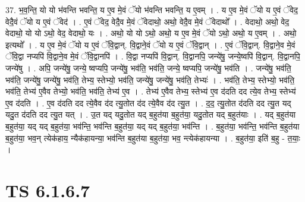 \documentclass[17pt]{extarticle}
\begin{document}
37. भ॒व॒न्ति॒ यो यो भ॑वन्ति भवन्ति॒ य ए॒व मे॒वं ॅयो भ॑वन्ति भवन्ति॒ य ए॒वम् । . य ए॒व मे॒वं ॅयो य ए॒वं ॅवेद॒ वेदै॒वं ॅयो य ए॒वं ॅवेद॑ । . ए॒वं ॅवेद॒ वेदै॒व मे॒वं ॅवेदाथो॒ अथो॒ वेदै॒व मे॒वं ॅवेदाथो᳚ । . वेदाथो॒ अथो॒ वेद॒ वेदाथो॒ यो यो ऽथो॒ वेद॒ वेदाथो॒ यः । . अथो॒ यो यो ऽथो॒ अथो॒ य ए॒व मे॒वं ॅयो ऽथो॒ अथो॒ य ए॒वम् । . अथो॒ इत्यथो᳚ । . य ए॒व मे॒वं ॅयो य ए॒वं ॅवि॒द्वान्. वि॒द्वा‍ने॒वं ॅयो य ए॒वं ॅवि॒द्वान् । . ए॒वं ॅवि॒द्वान्. वि॒द्वाने॒व मे॒वं ॅवि॒द्वा नप्यपि॑ वि॒द्वाने॒व मे॒वं ॅवि॒द्वानपि॑ । . वि॒द्वा नप्यपि॑ वि॒द्वान्. वि॒द्वानपि॒ जन्ये॑षु॒ जन्ये॒ष्वपि॑ वि॒द्वान्. वि॒द्वानपि॒ जन्ये॑षु । . अपि॒ जन्ये॑षु॒ जन्ये॒ ष्वप्यपि॒ जन्ये॑षु॒ भव॑ति॒ भव॑ति॒ जन्ये॒ ष्वप्यपि॒ जन्ये॑षु॒ भव॑ति । . जन्ये॑षु॒ भव॑ति॒ भव॑ति॒ जन्ये॑षु॒ जन्ये॑षु॒ भव॑ति॒ तेभ्य॒ स्तेभ्यो॒ भव॑ति॒ जन्ये॑षु॒ जन्ये॑षु॒ भव॑ति॒ तेभ्यः॑ । . भव॑ति॒ तेभ्य॒ स्तेभ्यो॒ भव॑ति॒ भव॑ति॒ तेभ्य॑ ए॒वैव तेभ्यो॒ भव॑ति॒ भव॑ति॒ तेभ्य॑ ए॒व । . तेभ्य॑ ए॒वैव तेभ्य॒ स्तेभ्य॑ ए॒व द॑दति दद त्ये॒व तेभ्य॒ स्तेभ्य॑ ए॒व द॑दति । . ए॒व द॑दति दद त्ये॒वैव द॑द त्यु॒तोत द॑द त्ये॒वैव द॑द त्यु॒त । . द॒द॒ त्यु॒तोत द॑दति दद त्यु॒त यद् यदु॒त द॑दति दद त्यु॒त यत् । . उ॒त यद् यदु॒तोत यद् ब॒हुत॑या ब॒हुत॑या॒ यदु॒तोत यद् ब॒हुत॑याः । . यद् ब॒हुत॑या ब॒हुत॑या॒ यद् यद् ब॒हुत॑या॒ भव॑न्ति॒ भव॑न्ति ब॒हुत॑या॒ यद् यद् ब॒हुत॑या॒ भव॑न्ति । . ब॒हुत॑या॒ भव॑न्ति॒ भव॑न्ति ब॒हुत॑या ब॒हुत॑या॒ भव॒न् त्येक॑हाय॒ न्यैक॑हायन्या॒ भव॑न्ति ब॒हुत॑या ब॒हुत॑या॒ भव॒ न्त्येक॑हायन्या । . ब॒हुत॑या॒ इति॑ ब॒हु - त॒याः॒ । \newline
\pagebreak
{}

\section{ TS 6.1.6.7 }
\end{document}
